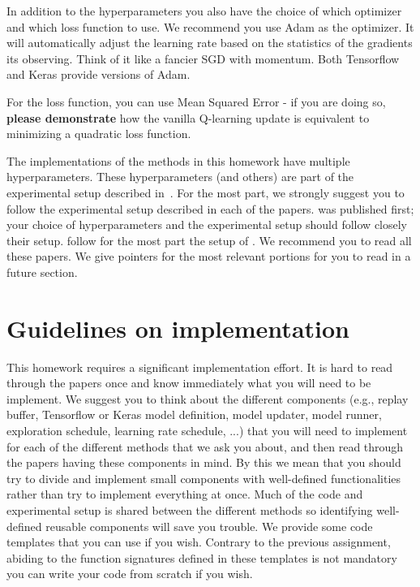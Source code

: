 \documentclass[12pt]{article}
\begin{document}
In addition to the hyperparameters you also have the choice of which
optimizer and which loss function to use. We recommend you use Adam as
the optimizer. It will automatically adjust the learning rate based on
the statistics of the gradients its observing. Think of it like a
fancier SGD with momentum. Both Tensorflow and Keras provide versions
of Adam.

For the loss function, you can use Mean Squared Error - if you are doing so, \textbf{please demonstrate} how the vanilla Q-learning update is equivalent to minimizing a quadratic loss function. 

The implementations of the methods in this homework have multiple
hyperparameters.  These hyperparameters (and others) are part of the
experimental setup described in~\cite{mnih2013playing, mnih2015human}.
For the most part, we strongly suggest you to follow the experimental
setup described in each of the papers.  \cite{mnih2013playing,
  mnih2015human} was published first; your choice of hyperparameters
and the experimental setup should follow closely their setup.
\cite{van2016deep, wang2015dueling} follow for the most part the setup
of \cite{mnih2013playing, mnih2015human}.  We recommend you to read
all these papers.  We give pointers for the most relevant portions for
you to read in a future section.

\section*{Guidelines on implementation}

This homework requires a significant implementation effort. It is hard to read through the papers once and know immediately what you will need to be implement. We suggest you to think about the different components (e.g., replay buffer, Tensorflow or Keras model definition, model updater, model runner,
exploration schedule, learning rate schedule, ...) that you will need to implement for each of the different methods that we ask you about, and then read through the papers having these components in mind. By this we mean that you should try to divide and implement small components with well-defined functionalities rather than try to implement everything at once. Much of the code and experimental setup is shared between the different methods so identifying well-defined reusable components will 
save you trouble. We provide some code templates that you can use if you wish. Contrary to the previous assignment, abiding to the function signatures defined in these templates is not mandatory you can write your code from scratch if you wish. 
\end{document}
